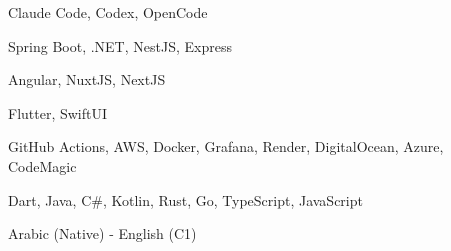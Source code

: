 
\begin{cvskills}
    {Claude Code, Codex, OpenCode}

    {Spring Boot, .NET, NestJS, Express} %

    {Angular, NuxtJS, NextJS} %

    {Flutter, SwiftUI} %

    {GitHub Actions, AWS, Docker, Grafana, Render, DigitalOcean, Azure, CodeMagic} %

    {Dart, Java, C\#, Kotlin, Rust, Go, TypeScript, JavaScript} %

    {Arabic (Native) - English (C1)}

\end{cvskills}
